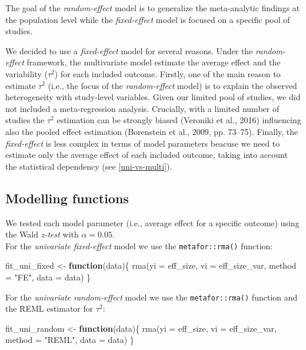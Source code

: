 \documentclass[
]{article}
\newenvironment{Shaded}{\begin{snugshade}}{\end{snugshade}}
\newcommand{\AttributeTok}[1]{\textcolor[rgb]{0.77,0.63,0.00}{#1}}
\newcommand{\ControlFlowTok}[1]{\textcolor[rgb]{0.13,0.29,0.53}{\textbf{#1}}}
\newcommand{\FunctionTok}[1]{\textcolor[rgb]{0.00,0.00,0.00}{#1}}
\newcommand{\NormalTok}[1]{#1}
\newcommand{\OtherTok}[1]{\textcolor[rgb]{0.56,0.35,0.01}{#1}}
\newcommand{\StringTok}[1]{\textcolor[rgb]{0.31,0.60,0.02}{#1}}
\begin{document}
The goal of the \emph{random-effect} model is to generalize the meta-analytic findings at the population level while the \emph{fixed-effect} model is focused on a specific pool of studies.

We decided to use a \emph{fixed-effect} model for several reasons. Under the \emph{random-effect} framework, the multivariate model estimate the average effect and the variability (\(\tau^2\)) for each included outcome. Firstly, one of the main reason to estimate \(\tau^2\) (i.e., the focus of the \emph{random-effect} model) is to explain the observed heterogeneity with study-level variables. Given our limited pool of studies, we did not included a meta-regression analysis.
Crucially, with a limited number of studies the \(\tau^2\) estimation can be strongly biased (Veroniki et al., 2016) influencing also the pooled effect estimation (Borenstein et al., 2009, pp. 73--75). Finally, the \emph{fixed-effect} is less complex in terms of model parameters beacuse we need to estimate only the average effect of each included outcome, taking into account the statistical dependency (see \ref{uni-vs-multi}).

\hypertarget{modelling-functions}{%
\subsection{Modelling functions}\label{modelling-functions}}

We tested each model parameter (i.e., average effect for a specific outcome) using the Wald \emph{z-test} with \(\alpha = 0.05\).\\
For the \emph{univariate fixed-effect} model we use the \texttt{metafor::rma()} function:

\begin{Shaded}
\begin{Highlighting}[]
\NormalTok{fit\_uni\_fixed }\OtherTok{\textless{}{-}} \ControlFlowTok{function}\NormalTok{(data)\{}
    \FunctionTok{rma}\NormalTok{(}\AttributeTok{yi =}\NormalTok{ eff\_size, }
        \AttributeTok{vi =}\NormalTok{ eff\_size\_var,}
        \AttributeTok{method =} \StringTok{"FE"}\NormalTok{,}
        \AttributeTok{data =}\NormalTok{ data)}
\NormalTok{\}}
\end{Highlighting}
\end{Shaded}

For the \emph{univariate random-effect} model we use the \texttt{metafor::rma()} function and the REML estimator for \(\tau^2\):

\begin{Shaded}
\begin{Highlighting}[]
\NormalTok{fit\_uni\_random }\OtherTok{\textless{}{-}} \ControlFlowTok{function}\NormalTok{(data)\{}
    \FunctionTok{rma}\NormalTok{(}\AttributeTok{yi =}\NormalTok{ eff\_size, }
        \AttributeTok{vi =}\NormalTok{ eff\_size\_var,}
        \AttributeTok{method =} \StringTok{"REML"}\NormalTok{,}
        \AttributeTok{data =}\NormalTok{ data)}
\NormalTok{\}}
\end{Highlighting}
\end{Shaded}
\end{document}
